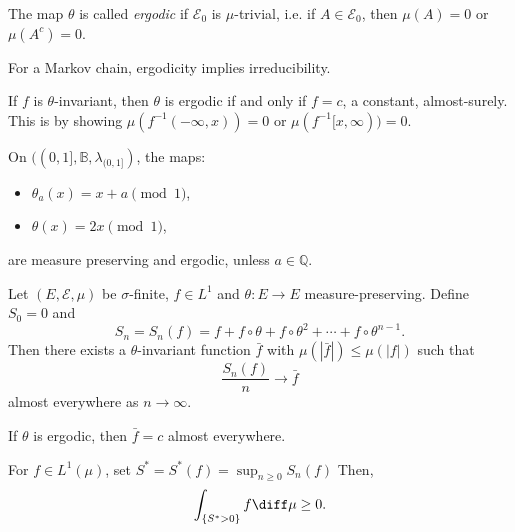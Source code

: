 \documentclass[12pt]{article}
\begin{document}
\begin{definition}
	The map $\theta$ is called \emph{ergodic} if $\mathcal{E}_0$ is $\mu$-trivial, i.e. if $A \in \mathcal{E}_0$, then $\mu(A) = 0$ or $\mu(A^{c}) = 0$.
\end{definition}

For a Markov chain, ergodicity implies irreducibility.

If $f$ is $\theta$-invariant, then $\theta$ is ergodic if and only if $f = c$, a constant, almost-surely. This is by showing $\mu(f^{-1}(-\infty, x)) = 0$ or $\mu(f^{-1}[x, \infty)) = 0$.

\begin{exbox}
	On $((0, 1], \mathbb{B}, \lambda_{(0, 1]})$, the maps:
	\begin{itemize}
		\item $\theta_{a}(x) = x + a \pmod 1$,
		\item $\theta(x) = 2x \pmod 1$,
	\end{itemize}
	are measure preserving and ergodic, unless $a \in \mathbb{Q}$.
\end{exbox}

\begin{theorem}
	Let $(E, \mathcal{E}, \mu)$ be $\sigma$-finite, $f \in L^1$ and $\theta : E \to E$ measure-preserving. Define $S_0 = 0$ and
	\[
	S_n = S_n(f) = f + f \circ \theta + f \circ \theta^2 + \cdots + f \circ \theta^{n-1}.
	\]
	Then there exists a $\theta$-invariant function $\bar f$ with $\mu(|\bar f|) \leq \mu(|f|)$ such that
	\[
	\frac{S_n(f)}{n} \to \bar f
	\]
	almost everywhere as $n \to \infty$.
\end{theorem}

If $\theta$ is ergodic, then $\bar f = c$ almost everywhere.

\begin{lemma}
	For $f \in L^1(\mu)$, set $S^{\ast} = S^{\ast}(f) = \sup_{n \geq 0}S_n(f)$ Then,
	\[
		\int_{\{S^{\ast} > 0\}} f \diff \mu \geq 0.
	\]
\end{lemma}
\end{document}
